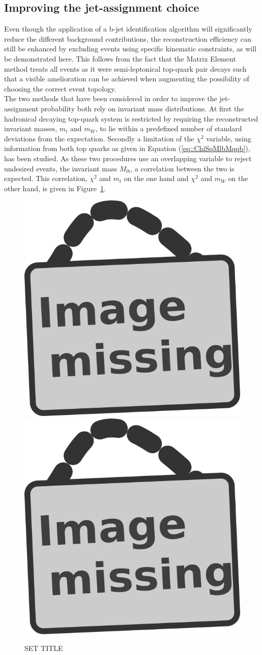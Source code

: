 \subsection{Improving the jet-assignment choice}\label{subsec::MassCuts}
Even though the application of a b-jet identification algorithm will significantly reduce the different background contributions, the reconstruction efficiency can still be enhanced by excluding events using specific kinematic constraints, as will be demonstrated here.
This follows from the fact that the Matrix Element method treats all events as it were semi-leptonical top-quark pair decays such that a visible amelioration can be achieved when augmenting the possibility of choosing the correct event topology.
\\
The two methods that have been considered in order to improve the jet-assignment probability both rely on invariant mass distributions. %
At first the hadronical decaying top-quark system is restricted by requiring the reconstructed invariant masses, $m_t$ and $m_W$, to lie within a predefined number of standard deviations from the expectation. Secondly a limitation of the $\chi^{2}$ variable, using information from both top quarks as given in Equation (\ref{eq::ChiSqMlbMqqb}), has been studied.
As these two procedures use an overlapping variable to reject undesired events, the invariant mass $M_{lb}$, a correlation between the two is expected.
This correlation, $\chi^{2}$ and $m_{t}$ on the one hand and $\chi^{2}$ and $m_{W}$ on the other hand, is given in Figure~\ref{fig::2Dexclusion}.

\begin{figure}[h!t]
 \centering
 \includegraphics[width = 0.35 \textwidth]{image.png} %
 \includegraphics[width = 0.35 \textwidth]{image.png} %
 \caption{SET TITLE} \label{fig::2Dexclusion}
\end{figure}

